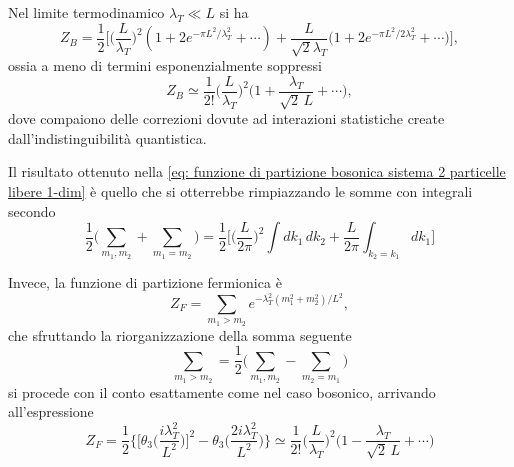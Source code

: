 Nel limite termodinamico $\lambda_T \ll L$ si ha
\begin{equation}
    Z_B = \frac{1}{2} \bigg[ \bigg( \frac{L}{\lambda_T} \bigg)^2 \left( 1 + 2 e^{-\pi L^2/\lambda_T^2} + \cdots \right) + \frac{L}{\sqrt{2}\lambda_T} \bigg( 1 + 2 e^{-\pi L^2/2\lambda_T^2} + \cdots \bigg) \bigg],
\end{equation}
ossia a meno di termini esponenzialmente soppressi
\begin{equation}
\label{eq: funzione di partizione bosonica sistema 2 particelle libere 1-dim}
    Z_B \simeq \frac{1}{2!} \bigg( \frac{L}{\lambda_T} \bigg)^2 \bigg( 1 + \frac{\lambda_T}{\sqrt{2}\,L} + \cdots \bigg),
\end{equation}
dove compaiono delle correzioni dovute ad interazioni statistiche create dall'indistinguibilità quantistica.
\begin{obs}
    Il risultato ottenuto nella \eqref{eq: funzione di partizione bosonica sistema 2 particelle libere 1-dim} è quello che si otterrebbe rimpiazzando le somme con integrali secondo
    \begin{equation}
        \frac{1}{2} \bigg( \sum_{m_1,m_2} + \sum_{m_1=m_2} \bigg) = \frac{1}{2}\bigg[\bigg( \frac{L}{2\pi} \bigg)^2 \int dk_1\, dk_2 + \frac{L}{2\pi} \int_{k_2=k_1} dk_1\bigg]
    \end{equation}
\end{obs}
Invece, la funzione di partizione fermionica è
\begin{equation}
    Z_F = \sum_{m_1>m_2} e^{-\lambda_T^2(m_1^2+m_2^2)/L^2},
\end{equation}
che sfruttando la riorganizzazione della somma seguente
\begin{equation}
    \sum_{m_1>m_2} = \frac{1}{2} \bigg( \sum_{m_1,m_2} - \sum_{m_2=m_1} \bigg)
\end{equation}
si procede con il conto esattamente come nel caso bosonico, arrivando all'espressione
\begin{equation}
\label{eq: funzione di partizione fermionica sistema 2 particelle libere 1-dim}
    Z_F = \frac{1}{2} \bigg\{\bigg[\theta_3\bigg(\frac{i\lambda_T^2}{L^2}\bigg)\bigg]^2 - \theta_3\bigg(\frac{2i\lambda_T^2}{L^2}\bigg)\bigg\} \simeq \frac{1}{2!} \bigg( \frac{L}{\lambda_T} \bigg)^2 \bigg( 1 - \frac{\lambda_T}{\sqrt{2}\,L} + \cdots \bigg)
\end{equation}

